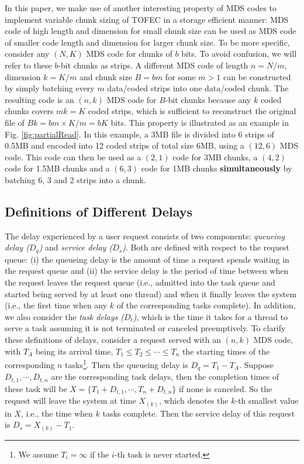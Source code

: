 \documentclass[journal]{IEEEtran}
\newcommand{\ourproposal}{TOFEC\xspace}
\begin{document}
In this paper, we make use of another interesting property of MDS codes to implement variable chunk sizing of \ourproposal in a storage efficient manner:  MDS code of high length and dimension for small chunk size can be used as MDS code of smaller code length and dimension for larger chunk size. To be more specific, consider any $(N,K)$ MDS code for chunks of $b$ bits. To avoid confusion, we will refer to these $b$-bit chunks as strips. A different MDS code of length $n = N/m$, dimension $k=K/m$ and chunk size $B=b m$ for some $m>1$ can be constructed by simply batching every $m$ data/coded strips into one data/coded chunk. The resulting code is an $(n,k)$ MDS code for $B$-bit chunks because any $k$ coded chunks covers $mk = K$ coded strips, which is sufficient to reconstruct the original file of $Bk = b m \times K/m = bK$ bits.  This property is illustrated as an example in Fig. \ref{fig:partialRead}. In this example, a 3MB file is divided into 6 strips of 0.5MB and encoded into 12 coded strips of total size 6MB, using a $(12,6)$ MDS code. This code can then be used as a $(2,1)$ code for 3MB chunks, a $(4,2)$ code for 1.5MB chunks and a $(6,3)$ code for 1MB chunks {\bf simultaneously} by batching 6, 3 and 2 strips into a chunk. 



\subsection{Definitions of Different Delays}
The delay experienced by a user request consists of two components: {\em queueing delay ($D_q$)} and {\em service delay ($D_s$)}. Both are defined with respect to the request queue: (i) the queueing delay is the amount of time a request spends waiting in the request queue and (ii) the service delay is the period of time between when the request leaves the request queue (i.e., admitted into the task queue and started being served by at least one thread) and when it finally leaves the system (i.e., the first time when any $k$ of the corresponding tasks complete). In addition, we also consider the {\em task delays ($D_t$)}, which is the time it takes for a thread to serve a task assuming it is not terminated or canceled preemptively. To clarify these definitions of delays, consider a request served with an $(n,k)$ MDS code, with $T_A$ being its arrival time, $T_1\le T_2\le \cdots \le T_n$ the starting times of the corresponding $n$ tasks\footnote{We assume $T_i = \infty$ if the $i$-th task is never started.}. Then the queueing delay is $D_q = T_1 - T_A$. Suppose $D_{t,1},\cdots,D_{t,n}$ are the corresponding task delays, then the completion times of these task will be $X=\{T_1+D_{t,1},\cdots,T_n+D_{t,n}\}$ if none is canceled. So the request will leave the system at time $X_{(k)}$, which denotes the $k$-th smallest value in $X$, i.e., the time when $k$ tasks complete. Then the service delay of this request is $D_s = X_{(k)} - T_1$.
\end{document}
